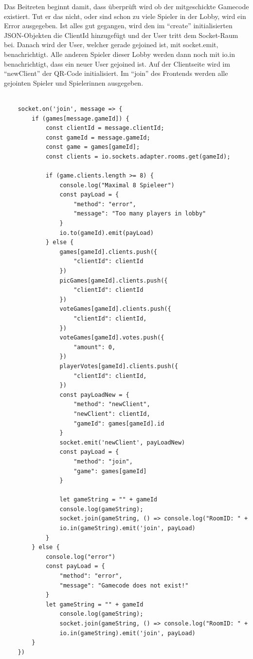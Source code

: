 Das Beitreten beginnt damit, dass überprüft wird ob der mitgeschickte Gamecode existiert.
Tut er das nicht, oder sind schon zu viele Spieler in der Lobby, wird ein Error ausgegeben. Ist alles gut gegangen, wird den im ``create'' initialisierten JSON-Objekten die ClientId hinzugefügt und der User tritt dem Socket-Raum bei. Danach wird der User, welcher gerade gejoined ist, mit socket.emit,
benachrichtigt. Alle anderen Spieler dieser Lobby werden dann noch mit io.in benachrichtigt,
dass ein neuer User gejoined ist. Auf der Clientseite wird im ``newClient'' der QR-Code initialisiert.
Im ``join'' des Frontends werden alle gejointen Spieler und Spielerinnen ausgegeben.
\begin{lstlisting}[language=html,caption=Join Game Server]
    
    socket.on('join', message => {
        if (games[message.gameId]) {
            const clientId = message.clientId;
            const gameId = message.gameId;
            const game = games[gameId];
            const clients = io.sockets.adapter.rooms.get(gameId);

            if (game.clients.length >= 8) {
                console.log("Maximal 8 Spieleer")
                const payLoad = {
                    "method": "error",
                    "message": "Too many players in lobby"
                }
                io.to(gameId).emit(payLoad)
            } else {
                games[gameId].clients.push({
                    "clientId": clientId
                })
                picGames[gameId].clients.push({
                    "clientId": clientId
                })
                voteGames[gameId].clients.push({
                    "clientId": clientId,
                })
                voteGames[gameId].votes.push({
                    "amount": 0,
                })
                playerVotes[gameId].clients.push({
                    "clientId": clientId,
                })
                const payLoadNew = {
                    "method": "newClient",
                    "newClient": clientId,
                    "gameId": games[gameId].id
                }
                socket.emit('newClient', payLoadNew)
                const payLoad = {
                    "method": "join",
                    "game": games[gameId]
                }

                let gameString = "" + gameId
                console.log(gameString);
                socket.join(gameString, () => console.log("RoomID: " + socket.rooms))
                io.in(gameString).emit('join', payLoad)
            }
        } else {
            console.log("error")
            const payLoad = {
                "method": "error",
                "message": "Gamecode does not exist!"
            }
            let gameString = "" + gameId
                console.log(gameString);
                socket.join(gameString, () => console.log("RoomID: " + socket.rooms))
                io.in(gameString).emit('join', payLoad)
        }
    })


\end{lstlisting}

